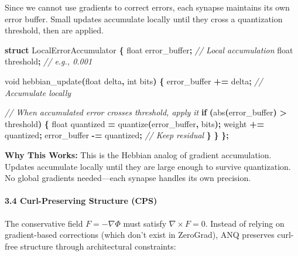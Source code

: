 \documentclass[
  11pt,
  a4paper,
]{article}
\newenvironment{Shaded}{\begin{snugshade}}{\end{snugshade}}
\newcommand{\CommentTok}[1]{\textcolor[rgb]{0.56,0.35,0.01}{\textit{#1}}}
\newcommand{\ControlFlowTok}[1]{\textcolor[rgb]{0.13,0.29,0.53}{\textbf{#1}}}
\newcommand{\DataTypeTok}[1]{\textcolor[rgb]{0.13,0.29,0.53}{#1}}
\newcommand{\KeywordTok}[1]{\textcolor[rgb]{0.13,0.29,0.53}{\textbf{#1}}}
\newcommand{\NormalTok}[1]{#1}
\newcommand{\OperatorTok}[1]{\textcolor[rgb]{0.81,0.36,0.00}{\textbf{#1}}}
\begin{document}
Since we cannot use gradients to correct errors, each synapse maintains
its own error buffer. Small updates accumulate locally until they cross
a quantization threshold, then are applied.

\begin{Shaded}
\begin{Highlighting}[]
\KeywordTok{struct}\NormalTok{ LocalErrorAccumulator }\OperatorTok{\{}
    \DataTypeTok{float}\NormalTok{ error\_buffer}\OperatorTok{;}        \CommentTok{// Local accumulation}
    \DataTypeTok{float}\NormalTok{ threshold}\OperatorTok{;}           \CommentTok{// e.g., 0.001}
    
    \DataTypeTok{void}\NormalTok{ hebbian\_update}\OperatorTok{(}\DataTypeTok{float}\NormalTok{ delta}\OperatorTok{,} \DataTypeTok{int}\NormalTok{ bits}\OperatorTok{)} \OperatorTok{\{}
\NormalTok{        error\_buffer }\OperatorTok{+=}\NormalTok{ delta}\OperatorTok{;}  \CommentTok{// Accumulate locally}
        
        \CommentTok{// When accumulated error crosses threshold, apply it}
        \ControlFlowTok{if} \OperatorTok{(}\NormalTok{abs}\OperatorTok{(}\NormalTok{error\_buffer}\OperatorTok{)} \OperatorTok{\textgreater{}}\NormalTok{ threshold}\OperatorTok{)} \OperatorTok{\{}
            \DataTypeTok{float}\NormalTok{ quantized }\OperatorTok{=}\NormalTok{ quantize}\OperatorTok{(}\NormalTok{error\_buffer}\OperatorTok{,}\NormalTok{ bits}\OperatorTok{);}
\NormalTok{            weight }\OperatorTok{+=}\NormalTok{ quantized}\OperatorTok{;}
\NormalTok{            error\_buffer }\OperatorTok{{-}=}\NormalTok{ quantized}\OperatorTok{;}  \CommentTok{// Keep residual}
        \OperatorTok{\}}
    \OperatorTok{\}}
\OperatorTok{\};}
\end{Highlighting}
\end{Shaded}

\textbf{Why This Works:} This is the Hebbian analog of gradient
accumulation. Updates accumulate locally until they are large enough to
survive quantization. No global gradients needed---each synapse handles
its own precision.

\paragraph{3.4 Curl-Preserving Structure
(CPS)}\label{curl-preserving-structure-cps}

The conservative field \(F = -\nabla\Phi\) must satisfy
\(\nabla \times F = 0\). Instead of relying on gradient-based
corrections (which don't exist in ZeroGrad), ANQ preserves curl-free
structure through architectural constraints:
\end{document}
